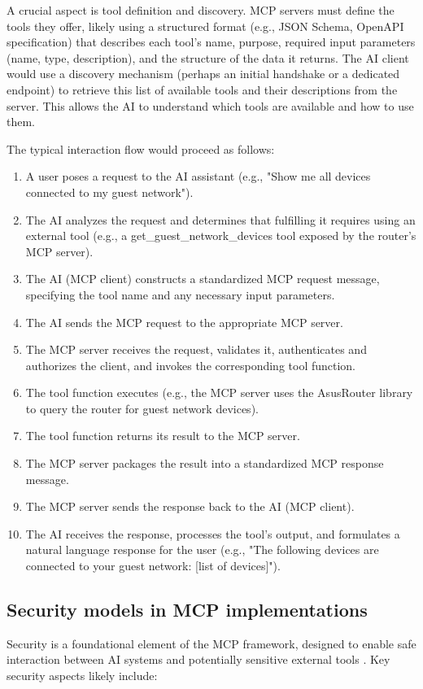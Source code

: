 A crucial aspect is tool definition and discovery. MCP servers must define the tools they offer, likely using a structured format (e.g., JSON Schema, OpenAPI specification) that describes each tool's name, purpose, required input parameters (name, type, description), and the structure of the data it returns. The AI client would use a discovery mechanism (perhaps an initial handshake or a dedicated endpoint) to retrieve this list of available tools and their descriptions from the server. This allows the AI to understand which tools are available and how to use them.

The typical interaction flow would proceed as follows:

\begin{enumerate}
\item A user poses a request to the AI assistant (e.g., "Show me all devices connected to my guest network").
\item The AI analyzes the request and determines that fulfilling it requires using an external tool (e.g., a get\_guest\_network\_devices tool exposed by the router's MCP server).
\item The AI (MCP client) constructs a standardized MCP request message, specifying the tool name and any necessary input parameters.
\item The AI sends the MCP request to the appropriate MCP server.
\item The MCP server receives the request, validates it, authenticates and authorizes the client, and invokes the corresponding tool function.
\item The tool function executes (e.g., the MCP server uses the AsusRouter library to query the router for guest network devices).
\item The tool function returns its result to the MCP server.
\item The MCP server packages the result into a standardized MCP response message.
\item The MCP server sends the response back to the AI (MCP client).
\item The AI receives the response, processes the tool's output, and formulates a natural language response for the user (e.g., "The following devices are connected to your guest network: [list of devices]").
\end{enumerate}

\subsection{Security models in MCP implementations}
Security is a foundational element of the MCP framework, designed to enable safe interaction between AI systems and potentially sensitive external tools \cite{mcp_docs}. Key security aspects likely include:

